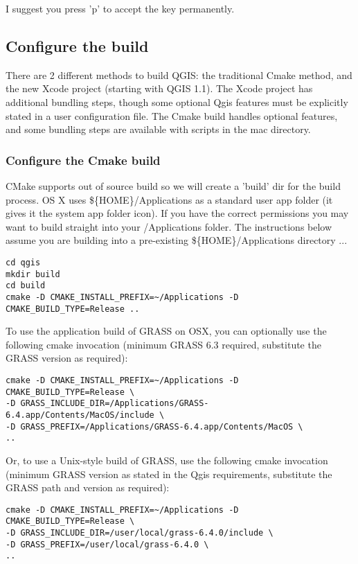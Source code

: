 I suggest you press 'p' to accept the key permanently.

\subsection{Configure the build}
There are 2 different methods to build QGIS: the traditional Cmake method,
and the new Xcode project (starting with QGIS 1.1). The Xcode project has
additional bundling steps, though some optional Qgis features must be explicitly
stated in a user configuration file. The Cmake build handles optional features,
and some bundling steps are available with scripts in the mac directory.

\subsubsection{Configure the Cmake build}
CMake supports out of source build so we will create a 'build' dir for the
build process. OS X uses \$\{HOME\}/Applications as a standard user app folder (it gives it the system app folder icon).
If you have the correct permissions you may want to build
straight into your /Applications folder. The instructions below assume you are
building into a pre-existing \$\{HOME\}/Applications directory ...

\begin{verbatim}
cd qgis
mkdir build
cd build
cmake -D CMAKE_INSTALL_PREFIX=~/Applications -D CMAKE_BUILD_TYPE=Release ..
\end{verbatim}

To use the application build of GRASS on OSX, you can optionally use the
following cmake invocation (minimum GRASS 6.3 required, substitute the GRASS
version as required):

\begin{verbatim}
cmake -D CMAKE_INSTALL_PREFIX=~/Applications -D CMAKE_BUILD_TYPE=Release \
-D GRASS_INCLUDE_DIR=/Applications/GRASS-6.4.app/Contents/MacOS/include \
-D GRASS_PREFIX=/Applications/GRASS-6.4.app/Contents/MacOS \
..
\end{verbatim}

Or, to use a Unix-style build of GRASS, use the following cmake invocation
(minimum GRASS version as stated in the Qgis requirements, substitute the GRASS
path and version as required):

\begin{verbatim}
cmake -D CMAKE_INSTALL_PREFIX=~/Applications -D CMAKE_BUILD_TYPE=Release \
-D GRASS_INCLUDE_DIR=/user/local/grass-6.4.0/include \
-D GRASS_PREFIX=/user/local/grass-6.4.0 \
..
\end{verbatim}

